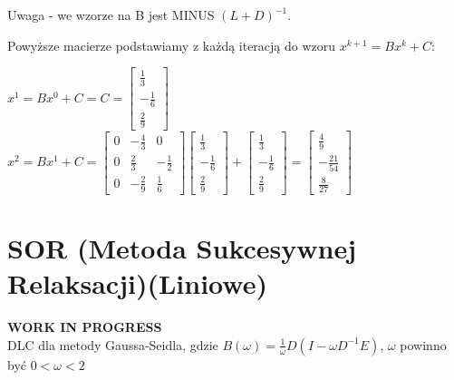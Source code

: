 \documentclass{article}
\begin{document}
Uwaga - we wzorze na B jest MINUS $(L+D)^{-1}$.

Powyższe macierze podstawiamy z każdą iteracją do wzoru $x^{k+1} = Bx^k + C$:

$x^1 = Bx^0 + C = C = \begin{bmatrix}\frac{1}{3}\\-\frac{1}{6}\\\frac{2}{9}\end{bmatrix} $ \\
$x^2 = Bx^1 + C = 
\begin{bmatrix}0 & -\frac{4}{3} & 0 \\0 & \frac{2}{3} & -\frac{1}{2} \\0 & -\frac{2}{9} & \frac{1}{6}\end{bmatrix}
\begin{bmatrix}\frac{1}{3}\\-\frac{1}{6}\\\frac{2}{9}\end{bmatrix}
+ \begin{bmatrix}\frac{1}{3}\\-\frac{1}{6}\\\frac{2}{9}\end{bmatrix}  = \begin{bmatrix}\frac{4}{9}\\-\frac{21}{54}\\\frac{8}{27}\end{bmatrix}$

\section{SOR (Metoda Sukcesywnej Relaksacji)(Liniowe)}
\textbf{WORK IN PROGRESS}\\
DLC dla metody Gaussa-Seidla, gdzie $B(\omega)=\frac{1}{\omega}D(I-\omega D^{-1}E)$, $\omega$ powinno być $0<\omega<2$
\end{document}
